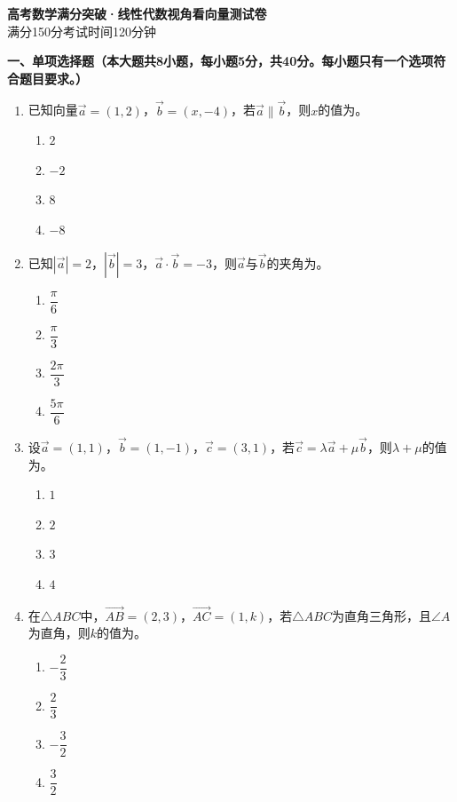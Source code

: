 \documentclass[12pt, a4paper]{ctexart}
\newcommand{\blank}[1]{\underline{\hspace{#1}}}
\begin{document}
\begin{center}
{\LARGE\bfseries 高考数学满分突破·线性代数视角看向量\quad 测试卷}\\[0.5em]
{\large 满分150分\quad 考试时间120分钟}
\end{center}

\vspace{1em}

\noindent\textbf{一、单项选择题（本大题共8小题，每小题5分，共40分。每小题只有一个选项符合题目要求。）}

\begin{enumerate}
\item 已知向量$\vec{a}=(1,2)$，$\vec{b}=(x,-4)$，若$\vec{a}\parallel\vec{b}$，则$x$的值为\blank{3cm}。
\begin{enumerate}[label=\Alph*.]
\item $2$
\item $-2$
\item $8$
\item $-8$
\end{enumerate}

\item 已知$|\vec{a}|=2$，$|\vec{b}|=3$，$\vec{a}\cdot\vec{b}=-3$，则$\vec{a}$与$\vec{b}$的夹角为\blank{3cm}。
\begin{enumerate}[label=\Alph*.]
\item $\dfrac{\pi}{6}$
\item $\dfrac{\pi}{3}$
\item $\dfrac{2\pi}{3}$
\item $\dfrac{5\pi}{6}$
\end{enumerate}

\item 设$\vec{a}=(1,1)$，$\vec{b}=(1,-1)$，$\vec{c}=(3,1)$，若$\vec{c}=\lambda\vec{a}+\mu\vec{b}$，则$\lambda+\mu$的值为\blank{3cm}。
\begin{enumerate}[label=\Alph*.]
\item $1$
\item $2$
\item $3$
\item $4$
\end{enumerate}

\item 在$\triangle ABC$中，$\overrightarrow{AB}=(2,3)$，$\overrightarrow{AC}=(1,k)$，若$\triangle ABC$为直角三角形，且$\angle A$为直角，则$k$的值为\blank{3cm}。
\begin{enumerate}[label=\Alph*.]
\item $-\dfrac{2}{3}$
\item $\dfrac{2}{3}$
\item $-\dfrac{3}{2}$
\item $\dfrac{3}{2}$
\end{enumerate}


\end{enumerate}
\end{document}

